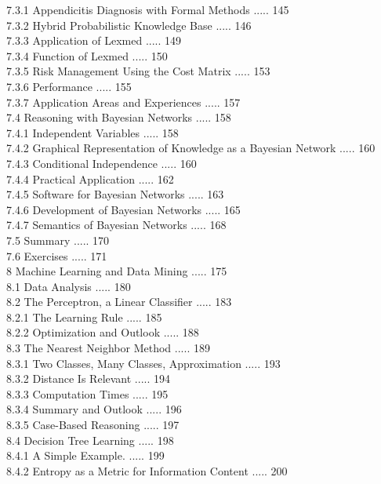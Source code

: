 \documentclass[10pt]{article}
\begin{document}
7.3.1 Appendicitis Diagnosis with Formal Methods ..... 145\\
7.3.2 Hybrid Probabilistic Knowledge Base ..... 146\\
7.3.3 Application of Lexmed ..... 149\\
7.3.4 Function of Lexmed ..... 150\\
7.3.5 Risk Management Using the Cost Matrix ..... 153\\
7.3.6 Performance ..... 155\\
7.3.7 Application Areas and Experiences ..... 157\\
7.4 Reasoning with Bayesian Networks ..... 158\\
7.4.1 Independent Variables ..... 158\\
7.4.2 Graphical Representation of Knowledge as a Bayesian Network ..... 160\\
7.4.3 Conditional Independence ..... 160\\
7.4.4 Practical Application ..... 162\\
7.4.5 Software for Bayesian Networks ..... 163\\
7.4.6 Development of Bayesian Networks ..... 165\\
7.4.7 Semantics of Bayesian Networks ..... 168\\
7.5 Summary ..... 170\\
7.6 Exercises ..... 171\\
8 Machine Learning and Data Mining ..... 175\\
8.1 Data Analysis ..... 180\\
8.2 The Perceptron, a Linear Classifier ..... 183\\
8.2.1 The Learning Rule ..... 185\\
8.2.2 Optimization and Outlook ..... 188\\
8.3 The Nearest Neighbor Method ..... 189\\
8.3.1 Two Classes, Many Classes, Approximation ..... 193\\
8.3.2 Distance Is Relevant ..... 194\\
8.3.3 Computation Times ..... 195\\
8.3.4 Summary and Outlook ..... 196\\
8.3.5 Case-Based Reasoning ..... 197\\
8.4 Decision Tree Learning ..... 198\\
8.4.1 A Simple Example. ..... 199\\
8.4.2 Entropy as a Metric for Information Content ..... 200\\
\end{document}
